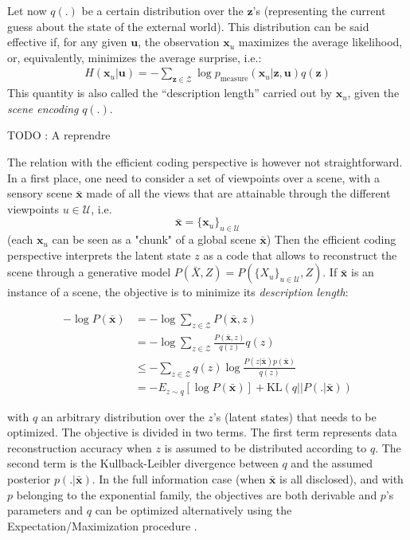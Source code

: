 \documentclass{article}
\begin{document}
Let now $q(.)$ be a certain distribution over the $\boldsymbol{z}$'s (representing the current guess about the state of the external world). This distribution can be said effective if, for any given $\boldsymbol{u}$, the observation $\boldsymbol{x}_u$ maximizes the average likelihood, or, equivalently, minimizes the average surprise, i.e.:
\begin{align}
H(\boldsymbol{x}_u| \boldsymbol{u})=-\sum_{\boldsymbol{z}\in\mathcal{Z}}\log p_\text{measure}(\boldsymbol{x}_u|\boldsymbol{z}, \boldsymbol{u}) q(\boldsymbol{z})
\end{align}  
This quantity is also called the ``description length'' \cite{hinton1994autoencoders} carried out by $\boldsymbol{x}_u$, given the \emph{scene encoding} $q(.)$.

{\color{magenta} TODO : A reprendre}

The relation with the efficient coding perspective \cite{hinton1994autoencoders} is however not straightforward. 
In a first place, one need to consider a set of viewpoints over a scene, with a sensory scene $\bar{\boldsymbol{x}}$ made of all the views that are attainable through the different viewpoints $u \in \mathcal{U}$, i.e. $$\bar{\boldsymbol{x}} = \{\boldsymbol{x}_u\}_{u\in \mathcal{U}}$$
(each $\boldsymbol{x}_u$ can be seen as a "chunk" of a global scene $\bar{\boldsymbol{x}}$)
Then the efficient coding perspective interprets the latent state $z$ as a code that allows to reconstruct the scene through a generative model $P(\bar{X}, Z) = P(\{X_u\}_{u \in \mathcal{U}}, Z)$. If $\bar{\boldsymbol{x}}$ is an instance of a scene, the objective is to minimize its \emph{description length}:

\begin{align}
-\log P(\bar{\boldsymbol{x}}) 
&= -\log \sum_{z \in \mathcal{Z}} P(\bar{\boldsymbol{x}}, z)\nonumber\\
&= -\log \sum_{z \in \mathcal{Z}} \frac{P(\bar{\boldsymbol{x}}, z)}{q(z)}q(z)\nonumber\\
&\leq  -\sum_{z \in \mathcal{Z}} q(z) \log\frac{P(z|\bar{\boldsymbol{x}})p(\bar{\boldsymbol{x}})}{q(z)}\nonumber\\
&= -E_{z\sim q} \left[ \log P(\bar{\boldsymbol{x}})\right]
+ \text{KL} (q||P(.|\bar{\boldsymbol{x}}))\label{eq:coding}
\end{align}

with $q$ an arbitrary distribution over the $z$'s (latent states) that needs to be optimized. The objective is divided in two terms. The first term represents data reconstruction accuracy when $z$ is assumed to be distributed according to $q$. The second term is the Kullback-Leibler divergence between $q$ and the assumed posterior $p(.|\bar{\boldsymbol{x}})$. In the full information case (when $\bar{\boldsymbol{x}}$ is all disclosed), and with $p$ belonging to the exponential family, the objectives are both derivable and $p$'s parameters and $q$ can be optimized alternatively using the Expectation/Maximization procedure \cite{Dempster1977}. 
\end{document}
